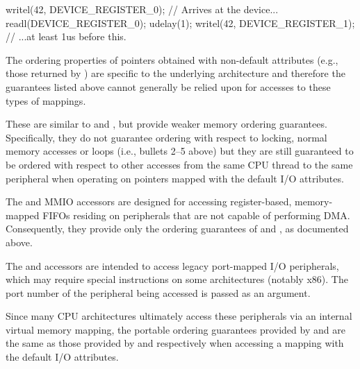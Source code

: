 \begin{description}[style=nextline]
\begin{enumerate}
\begin{VerbatimU}[tabsize=1]
		writel(42, DEVICE_REGISTER_0); // Arrives at the device...
		readl(DEVICE_REGISTER_0);
		udelay(1);
		writel(42, DEVICE_REGISTER_1); // ...at least 1us before this.
\end{VerbatimU}
	\end{enumerate}

	The ordering properties of  pointers obtained with
	non-default attributes (e.g., those returned by )
	are specific to the underlying architecture and therefore the
	guarantees listed above cannot generally be relied upon for accesses
	to these types of mappings.

 \item[\tco{readX_relaxed()}, \tco{writeX_relaxed()}:]

	These are similar to  and , but provide
	weaker memory ordering guarantees.
	Specifically, they do not guarantee ordering with respect to locking,
	normal memory accesses or  loops (i.e.,
	bullets 2--5 above) but they are still guaranteed to be ordered with
	respect to other accesses from the same CPU thread to the same
	peripheral when operating on  pointers mapped with the
        default I/O attributes.

 \item[\tco{readsX()}, \tco{writesX()}:]

	The  and  MMIO accessors are designed for
	accessing register-based, memory-mapped FIFOs residing on peripherals
	that are not capable of performing DMA\@.
	Consequently, they provide only the ordering guarantees of
	 and , as documented above.

 \item[\tco{inX()}, \tco{outX()}:]

	The  and  accessors are intended to access legacy
	port-mapped I/O peripherals, which may require special instructions
	on some architectures (notably x86).
	The port number of the peripheral being accessed is passed as an
	argument.

	Since many CPU architectures ultimately access these peripherals via an
	internal virtual memory mapping, the portable ordering guarantees
	provided by  and  are the same as those provided
	by  and  respectively when accessing a
	mapping with the default I/O attributes.


\end{description}
